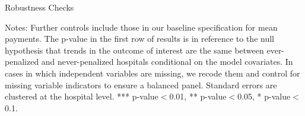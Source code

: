\documentclass[12pt]{article}
\begin{document}
\setlength{\captionmargin}{.5 \textwidth} \addtolength{\captionmargin}{-.5\wd\gfxbox}
\begin{table}[!h]
\centering
\caption{Robustness Checks}
\label{tab:robustness}
\usebox{\gfxbox}
\par
\begin{minipage}{\wd\gfxbox}
\footnotesize
Notes: Further controls include those in our baseline specification for mean payments.  The p-value in the first row of results is in reference to the null hypothesis that trends in the outcome of interest are the same between ever-penalized and never-penalized hospitals conditional on the model covariates.  In cases in which independent variables are missing, we recode them and control for missing variable indicators to ensure a balanced panel.  Standard errors are clustered at the hospital level.  *** p-value$<$0.01, ** p-value$<$0.05, * p-value$<$0.1.
\end{minipage}
\end{table}
\end{document}
